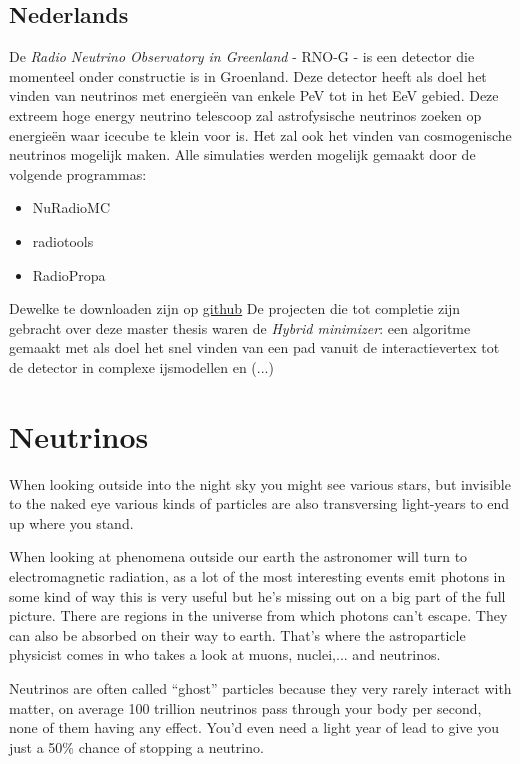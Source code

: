 \documentclass[11pt,a4paper,faculty=we,language=en,doctype=report]{cls/ugent-doc}
\begin{document}
\section*{Nederlands}
De \textit{Radio Neutrino Observatory in Greenland} - RNO-G - is een detector die momenteel onder constructie is
in Groenland. Deze detector heeft als doel het vinden van neutrinos met energieën van enkele PeV
tot in het EeV gebied. Deze extreem hoge energy neutrino telescoop zal astrofysische neutrinos
zoeken op energieën waar icecube te klein voor is. Het zal ook het vinden van cosmogenische
neutrinos mogelijk maken.
Alle simulaties werden mogelijk gemaakt door de volgende programmas:
\begin{itemize}
	\item NuRadioMC
	\item radiotools
	\item RadioPropa
\end{itemize}
Dewelke te downloaden zijn op \href{https://github.com/nu-radio}{github}
De projecten die tot completie zijn gebracht over deze master thesis waren de
\textit{Hybrid minimizer}: een algoritme gemaakt met als doel het snel vinden van
een pad vanuit de interactievertex tot de detector in complexe ijsmodellen en
(...)
\chapter{Neutrinos}

When looking outside into the night sky you might see various stars, but
invisible to the naked eye various kinds of particles are also transversing
light-years to end up where you stand.

When looking at phenomena outside our earth the astronomer will turn to
electromagnetic radiation, as a lot of the most interesting events emit photons
in some kind of way this is very useful but he's missing out on a big part of
the full picture.  There are regions in the universe from which photons can't
escape. They can also be absorbed on their way to earth.  That's where the
astroparticle physicist comes in who takes a look at muons, nuclei,... and
neutrinos.

Neutrinos are often called “ghost” particles because they very rarely interact
with matter, on average 100 trillion neutrinos pass through your body per
second, none of them having any effect.  You'd even need a light year of lead
to give you just a 50\% chance of stopping a neutrino.
\end{document}
